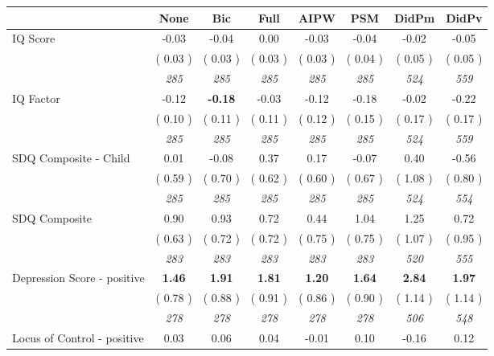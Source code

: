 \begin{tabular}{l c c c c c c c}
\toprule
 & None & Bic & Full & AIPW & PSM & DidPm & DidPv \\
\midrule
IQ Score &     -0.03 &     -0.04 &      0.00 &     -0.03 &     -0.04 &     -0.02 &     -0.05 \\
& (     0.03 ) & (     0.03 ) & (     0.03 ) & (     0.03 ) & (     0.04 ) & (     0.05 ) & (     0.05 ) \\
& \textit{ 285 } & \textit{ 285 } & \textit{ 285 } & \textit{ 285 } & \textit{ 285 } & \textit{ 524 } & \textit{ 559 } \\
IQ Factor &     -0.12 & \textbf{     -0.18 } &     -0.03 &     -0.12 &     -0.18 &     -0.02 &     -0.22 \\
& (     0.10 ) & (     0.11 ) & (     0.11 ) & (     0.12 ) & (     0.15 ) & (     0.17 ) & (     0.17 ) \\
& \textit{ 285 } & \textit{ 285 } & \textit{ 285 } & \textit{ 285 } & \textit{ 285 } & \textit{ 524 } & \textit{ 559 } \\
SDQ Composite - Child &      0.01 &     -0.08 &      0.37 &      0.17 &     -0.07 &      0.40 &     -0.56 \\
& (     0.59 ) & (     0.70 ) & (     0.62 ) & (     0.60 ) & (     0.67 ) & (     1.08 ) & (     0.80 ) \\
& \textit{ 285 } & \textit{ 285 } & \textit{ 285 } & \textit{ 285 } & \textit{ 285 } & \textit{ 524 } & \textit{ 554 } \\
SDQ Composite &      0.90 &      0.93 &      0.72 &      0.44 &      1.04 &      1.25 &      0.72 \\
& (     0.63 ) & (     0.72 ) & (     0.72 ) & (     0.75 ) & (     0.75 ) & (     1.07 ) & (     0.95 ) \\
& \textit{ 283 } & \textit{ 283 } & \textit{ 283 } & \textit{ 283 } & \textit{ 283 } & \textit{ 520 } & \textit{ 555 } \\
Depression Score - positive & \textbf{      1.46 } & \textbf{      1.91 } & \textbf{      1.81 } & \textbf{     1.20} & \textbf{     1.64} & \textbf{      2.84 } & \textbf{      1.97 } \\
& (     0.78 ) & (     0.88 ) & (     0.91 ) & (     0.86 ) & (     0.90 ) & (     1.14 ) & (     1.14 ) \\
& \textit{ 278 } & \textit{ 278 } & \textit{ 278 } & \textit{ 278 } & \textit{ 278 } & \textit{ 506 } & \textit{ 548 } \\
Locus of Control - positive &      0.03 &      0.06 &      0.04 &     -0.01 &      0.10 &     -0.16 &      0.12 \\

\end{tabular}
